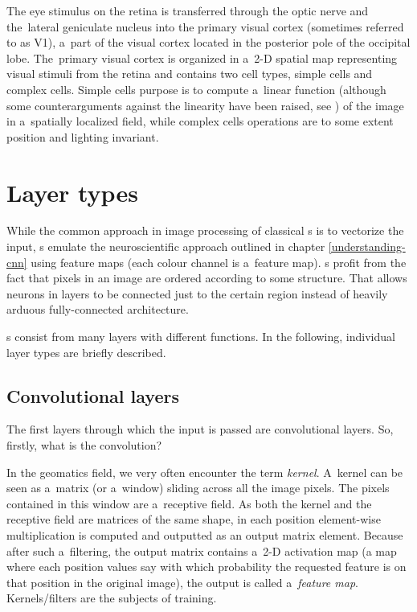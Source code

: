 The eye stimulus on the retina is transferred through the optic nerve and
the~lateral geniculate nucleus into the primary visual cortex (sometimes
referred to as V1), a~part of the visual cortex located in the posterior pole
of the occipital lobe. The~primary visual cortex is organized in a~2-D spatial
map representing visual stimuli from the retina and contains two cell types,
simple cells and complex cells. Simple cells purpose is to compute a~linear
function (although some counterarguments against the linearity have been
raised, see \cite{simple-cells}) of the image in a~spatially localized field,
while complex cells operations are to some extent position and lighting
invariant.

\section{Layer types}
\label{layers}

While the common approach in image processing of classical s is to 
vectorize the input, s emulate the neuroscientific approach outlined in
chapter \ref{understanding-cnn} using feature maps (each colour channel is
a~feature map). s profit from the fact that pixels in an image are
ordered according to some structure. That allows neurons in layers to be
connected just to the certain region instead of heavily arduous fully-connected
architecture. 

s consist from many layers with different functions. In the following,
individual layer types are briefly described. 

\subsection{Convolutional layers}
\label{conv-layers}

The first layers through which the input is passed are convolutional layers.
So, firstly, what is the convolution? 

In the geomatics field, we very often encounter the term \textit{kernel}.
A~kernel can be seen as a~matrix (or a~window) sliding across all the image
pixels. The pixels contained in this window are a~receptive field. As both the
kernel and the receptive field are matrices of the same shape, in each position
element-wise multiplication is computed and outputted as an output matrix
element. Because after such a~filtering, the output matrix contains a~2-D
activation map (a map where each position values say with which probability the
requested feature is on that position in the original image), the output is
called a~\textit{feature map}. Kernels/filters are the subjects of training.

